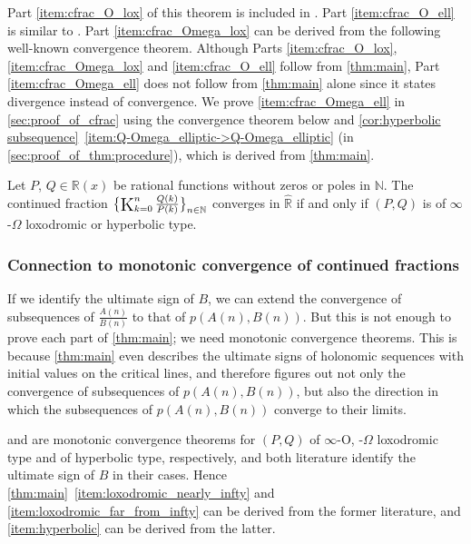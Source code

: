 \documentclass[a4paper,UKenglish,cleveref,autoref,thm-restate]{lipics-v2021}
\newcommand{\R}{\mathbb{R}}
\newcommand{\N}{\mathbb{N}}
\newcommand\Kettenbruch{\operatornamewithlimits{\mathchoice
     {\vcenter{\hbox{\huge $\mathrm{K}$}}}
     {\vcenter{\hbox{\Large $\mathrm{K}$}}}
     {\mathrm{K}}
     {\mathrm{K}}}}
\begin{document}
Part \eqref{item:cfrac_O_lox} of this theorem is included in \cite[Theorems~3.12 and 3.13]{LW08}. 
Part \eqref{item:cfrac_O_ell} is similar to \cite[Lemma~4.28]{LW08}. 
Part \eqref{item:cfrac_Omega_lox} can be derived from the following well-known convergence theorem. Although Parts \eqref{item:cfrac_O_lox}, \eqref{item:cfrac_Omega_lox} and \eqref{item:cfrac_O_ell} follow from \cref{thm:main}, Part \eqref{item:cfrac_Omega_ell} does not follow from \cref{thm:main} alone since it states divergence instead of convergence. 
We prove \eqref{item:cfrac_Omega_ell} in \cref{sec:proof_of_cfrac} using the convergence theorem below and \cref{cor:hyperbolic subsequence}~\eqref{item:Q-Omega_elliptic->Q-Omega_elliptic} (in \cref{sec:proof_of_thm:procedure}), which is derived from \cref{thm:main}. 





\begin{theorem} \label{thm:cfrac_cconverge}
Let $P$, $Q \in \R(x)$ be rational functions without zeros or poles in $\N$. 
The continued fraction $\bigl\{ \Kettenbruch _{k=0}^n \frac{Q(k)}{P(k)} \bigr\}_{n \in \N}$ converges in $\hat{\R}$ 
if and only if $(P, Q)$ is of $\infty$-$\Omega$ loxodromic or hyperbolic type. 
\end{theorem}





\subsubsection{Connection to monotonic convergence of continued fractions}\label{sec:monotonic_convergence_thm}

If we identify the ultimate sign of $B$, we can extend the convergence of subsequences of $\frac{A(n)}{B(n)}$ to that of $p(A(n), B(n))$. 
But this is not enough to prove each part of \cref{thm:main}; we need monotonic convergence theorems. 
This is because \cref{thm:main} even describes the ultimate signs of holonomic sequences with initial values on the critical lines, and therefore figures out not only the convergence of subsequences of $p(A(n), B(n))$, but also the direction in which the subsequences of $p(A(n), B(n))$ converge to their limits. 

\cite[Theorems 3.12 and 3.13]{LW08} and \cite[Lemma 3.4]{KKL+21} are monotonic convergence theorems for $(P, Q)$ of $\infty$-O, -$\Omega$ loxodromic type and of hyperbolic type, respectively, and both literature identify the ultimate sign of $B$ in their cases. Hence \cref{thm:main}~\eqref{item:loxodromic_nearly_infty} and \eqref{item:loxodromic_far_from_infty} can be derived from the former literature, and \eqref{item:hyperbolic} can be derived from the latter. 
\end{document}
